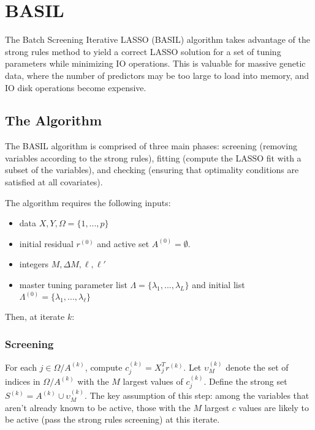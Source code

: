 \documentclass{amsart}
\begin{document}
\section{BASIL}

The Batch Screening Iterative LASSO (BASIL) \cite{qian_fast_2020} algorithm takes advantage of the
strong rules method to yield a correct LASSO solution for a set of tuning
parameters while minimizing IO operations. This is valuable for massive genetic
data, where the number of predictors may be too large to load into memory, and
IO disk operations become expensive. 

\subsection{The Algorithm} The BASIL algorithm is comprised of three main
phases: screening (removing variables according to the strong rules), fitting
(compute the LASSO fit with a subset of the variables), and checking (ensuring
that optimality conditions are satisfied at all covariates).

\bigskip

The algorithm requires the following inputs:

\begin{itemize}
	\item data $X, Y, \Omega = \{1, ..., p \}$
	\item initial residual $r^{(0)}$ and active set $A^{(0)} = \emptyset$. 
	\item integers $M, \Delta M, \ell, \ell'$
	\item master tuning parameter list $\Lambda = \{\lambda_1, ...,
	\lambda_L \}$ and initial list $\Lambda^{(0)} = \{ \lambda_1, ...,
	\lambda_{\ell} \}$
\end{itemize}

Then, at iterate $k$:

\subsubsection{Screening} For each $j \in \Omega / A^{(k)}$, compute $c_j^{(k)} =
X_j^Tr^{(k)}$. Let $\upsilon_M^{(k)}$ denote the set of indices in $\Omega / A^{(k)}$
with the $M$ largest values of $c_j^{(k)}$. Define the strong set $S^{(k)} =
A^{(k)} \cup \upsilon_M^{(k)}$. The key assumption of this step: among the
variables that aren't already known to be active, those with the $M$ largest $c$
values are likely to be active (pass the strong rules screening) at this
iterate. 
\end{document}
